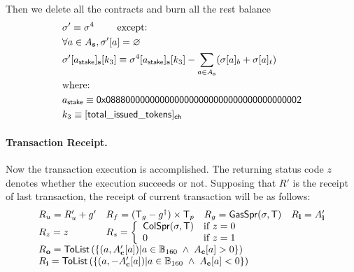 Then we delete all the contracts and burn all the rest balance 
%
\begin{align}
&\st' \eqdef \st^4 \qquad \mbox{  except:} \\ 
&\forall a \in A_{\bf s}, \st'[a] = \varnothing \\ 
&\st'[a_{\sf stake}]_{\bf s}[k_3] \eqdef \st^4[a_{\sf stake}]_{\bf s}[k_3] - \sum_{a\in A_{\bf s}} (\st[a]_b + \st[a]_t) \\
&\mbox{where:}  \\
&a_{\sf stake} \eqdef \stakingcontract \\ 
&k_3 \eqdef {\sf [total\char`_issued\char`_tokens]_{\sf ch}}  
\end{align}

\paragraph{Transaction Receipt.} 

Now the transaction execution is accomplished.
The returning status code $z$ denotes whether the execution succeeds or not. 
Supposing that $R'$ is the receipt of last transaction, 
the receipt of current transaction will be as follows:
\begin{align}
	\begin{array}{llll}
		R_u=R'_u+g' & R_f = (\tx_g-g^{\dagger})\times \tx_p & R_g = \mathsf{GasSpr}(\st,\tx) & R_{\bf l}=A'_{\bf l} \\  
		R_z=z & \multicolumn{3}{l}{R_s = \left\{\begin{array}{ll}
			\mathsf{ColSpr}(\st,\tx) & \text{if }z=0\\
			0 & \text{if }z=1
		\end{array}\right.} \\
		\multicolumn{4}{l}{R_{\bf o}=\mathsf{ToList}\left(\left\{ (a,A'_{\bf c}[a]) | a\in \B_{160}\;\wedge\; A_{\bf c}[a]>0 \right\}\right)}\\
		\multicolumn{4}{l}{R_{\bf i}=\mathsf{ToList}\left(\left\{(a,-A'_{\bf c}[a]) | a\in \B_{160}\;\wedge\; A_{\bf c}[a]<0  \right\}\right)}
	\end{array}
\end{align}
